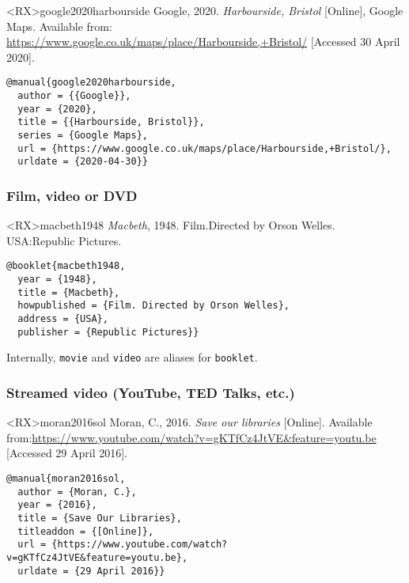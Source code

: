 \documentclass[10pt,a4paper]{article}
\newenvironment{info}{%
  \begin{list}{\makebox[2em][c]{\faInfoCircle}}{%
    \setlength{\leftmargin}{2em}
    \setlength{\labelwidth}{2em}
    \setlength{\labelsep}{0pt}}
}{\end{list}}
\begin{document}
\begin{bibexbox}<RX>{google2020harbourside}
  Google, 2020. \emph{Harbourside, Bristol} [Online], Google Maps. Available from: \url{https://www.google.co.uk/maps/place/Harbourside,+Bristol/} [Accessed 30 April 2020].
  \tcblower
\begin{Verbatim}
@manual{google2020harbourside,
  author = {{Google}},
  year = {2020},
  title = {{Harbourside, Bristol}},
  series = {Google Maps},
  url = {https://www.google.co.uk/maps/place/Harbourside,+Bristol/},
  urldate = {2020-04-30}}
\end{Verbatim}
\end{bibexbox}

\subsubsection*{Film, video or DVD}

\begin{bibexbox}<RX>{macbeth1948}
  \emph{Macbeth}, 1948. Film.\@ Directed by Orson Welles. USA:\@ Republic Pictures.
  \tcblower
\begin{Verbatim}
@booklet{macbeth1948,
  year = {1948},
  title = {Macbeth},
  howpublished = {Film. Directed by Orson Welles},
  address = {USA},
  publisher = {Republic Pictures}}
\end{Verbatim}
\end{bibexbox}

\begin{info}\item Internally, \texttt{movie} and \texttt{video} are aliases for \texttt{booklet}.\end{info}

\subsubsection*{Streamed video (YouTube, TED Talks, etc.)}

\begin{bibexbox}<RX>{moran2016sol}
  Moran, C., 2016. \emph{Save our libraries} [Online]. Available from:\@ \url{https://www.youtube.com/watch?v=gKTfCz4JtVE&feature=youtu.be} [Accessed 29 April 2016].
  \tcblower
\begin{Verbatim}
@manual{moran2016sol,
  author = {Moran, C.},
  year = {2016},
  title = {Save Our Libraries},
  titleaddon = {[Online]},
  url = {https://www.youtube.com/watch?v=gKTfCz4JtVE&feature=youtu.be},
  urldate = {29 April 2016}}
\end{Verbatim}
\end{bibexbox}
\end{document}

